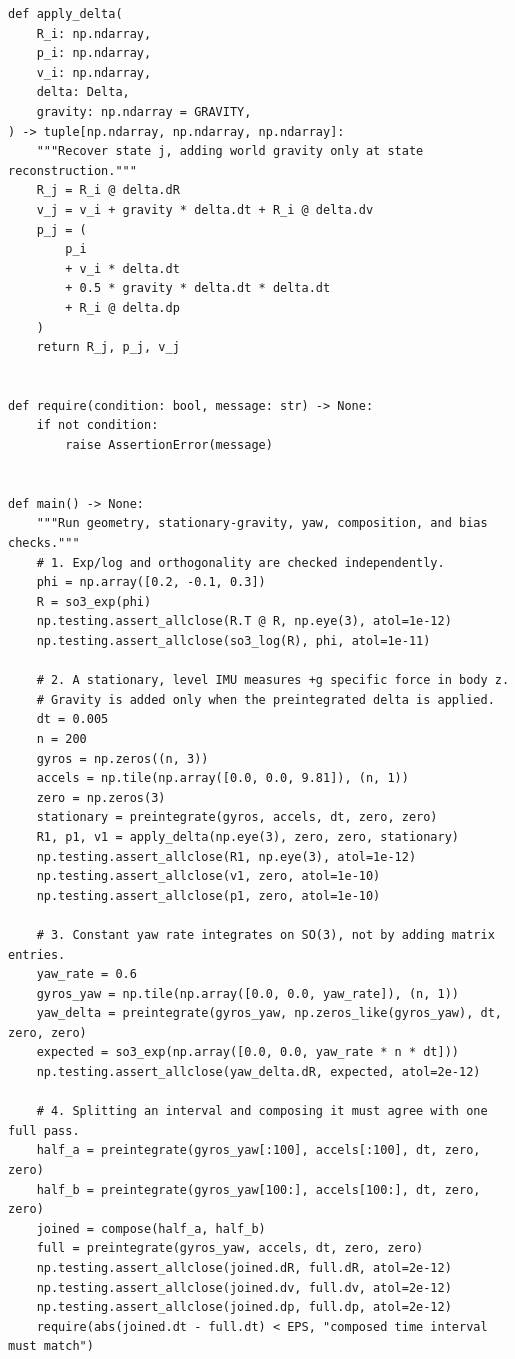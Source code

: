 \begin{verbatim}
def apply_delta(
    R_i: np.ndarray,
    p_i: np.ndarray,
    v_i: np.ndarray,
    delta: Delta,
    gravity: np.ndarray = GRAVITY,
) -> tuple[np.ndarray, np.ndarray, np.ndarray]:
    """Recover state j, adding world gravity only at state reconstruction."""
    R_j = R_i @ delta.dR
    v_j = v_i + gravity * delta.dt + R_i @ delta.dv
    p_j = (
        p_i
        + v_i * delta.dt
        + 0.5 * gravity * delta.dt * delta.dt
        + R_i @ delta.dp
    )
    return R_j, p_j, v_j


def require(condition: bool, message: str) -> None:
    if not condition:
        raise AssertionError(message)


def main() -> None:
    """Run geometry, stationary-gravity, yaw, composition, and bias checks."""
    # 1. Exp/log and orthogonality are checked independently.
    phi = np.array([0.2, -0.1, 0.3])
    R = so3_exp(phi)
    np.testing.assert_allclose(R.T @ R, np.eye(3), atol=1e-12)
    np.testing.assert_allclose(so3_log(R), phi, atol=1e-11)

    # 2. A stationary, level IMU measures +g specific force in body z.
    # Gravity is added only when the preintegrated delta is applied.
    dt = 0.005
    n = 200
    gyros = np.zeros((n, 3))
    accels = np.tile(np.array([0.0, 0.0, 9.81]), (n, 1))
    zero = np.zeros(3)
    stationary = preintegrate(gyros, accels, dt, zero, zero)
    R1, p1, v1 = apply_delta(np.eye(3), zero, zero, stationary)
    np.testing.assert_allclose(R1, np.eye(3), atol=1e-12)
    np.testing.assert_allclose(v1, zero, atol=1e-10)
    np.testing.assert_allclose(p1, zero, atol=1e-10)

    # 3. Constant yaw rate integrates on SO(3), not by adding matrix entries.
    yaw_rate = 0.6
    gyros_yaw = np.tile(np.array([0.0, 0.0, yaw_rate]), (n, 1))
    yaw_delta = preintegrate(gyros_yaw, np.zeros_like(gyros_yaw), dt, zero, zero)
    expected = so3_exp(np.array([0.0, 0.0, yaw_rate * n * dt]))
    np.testing.assert_allclose(yaw_delta.dR, expected, atol=2e-12)

    # 4. Splitting an interval and composing it must agree with one full pass.
    half_a = preintegrate(gyros_yaw[:100], accels[:100], dt, zero, zero)
    half_b = preintegrate(gyros_yaw[100:], accels[100:], dt, zero, zero)
    joined = compose(half_a, half_b)
    full = preintegrate(gyros_yaw, accels, dt, zero, zero)
    np.testing.assert_allclose(joined.dR, full.dR, atol=2e-12)
    np.testing.assert_allclose(joined.dv, full.dv, atol=2e-12)
    np.testing.assert_allclose(joined.dp, full.dp, atol=2e-12)
    require(abs(joined.dt - full.dt) < EPS, "composed time interval must match")


\end{verbatim}
